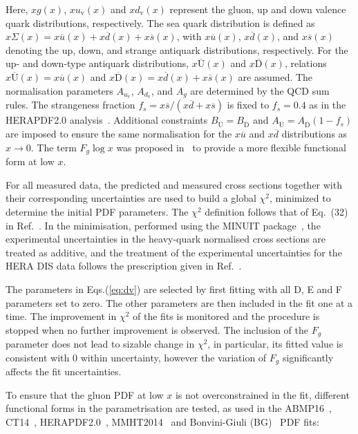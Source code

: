 \documentclass[12pt]{article}
\begin{document}
Here, $xg(x)$, $xu_{\mathrm{v}}(x)$ and $xd_{\mathrm{v}}(x)$ represent the gluon, up and down valence quark distributions, respectively. The sea quark distribution is defined as $x\Sigma(x)=x\overline{u}(x)+x\overline{d}(x)+x\overline{s}(x)$, with $x\overline{u}(x)$, $x\overline{d}(x)$, and $x\overline{s}(x)$ denoting the up, down, and strange antiquark distributions, respectively.
For the up- and down-type antiquark distributions, $x\overline{\mathrm{U}}(x)$ and $x\overline{\mathrm{D}}(x)$, relations $x\overline{\mathrm{U}}(x) = x\overline{u}(x)$ and $x\overline{\mathrm{D}}(x) = x\overline{d}(x) + x\overline{s}(x)$  are assumed.
The normalisation parameters $A_{u_{\mathrm{v}}}$, $A_{d_\mathrm{v}}$, and $A_{g}$ are determined by the QCD sum rules.
The strangeness fraction $f_{s} = x\overline{s}/( x\overline{d} + x\overline{s})$ is fixed to
$f_{s}=0.4$ as in the HERAPDF2.0 analysis~\cite{Abramowicz:2015mha}.
Additional constraints $B_{\overline{\mathrm{U}}} = B_{\overline{\mathrm{D}}}$ and $A_{\overline{\mathrm{U}}} = A_{\overline{\mathrm{D}}}(1 - f_{s})$ are imposed to ensure the same normalisation for the $x\overline{u}$ and $x\overline{d}$ distributions as $x \to 0$.
The term $F_g\log x$ was proposed in~\cite{Bonvini:2019wxf} to provide a more flexible functional form at low $x$.

For all measured data, the predicted and measured cross sections together with their corresponding uncertainties are used to build a global $\chi^2$, minimized to determine the initial PDF
parameters. The $\chi^2$ definition follows that of Eq.~(32) in Ref.~\cite{Abramowicz:2015mha}. In the minimisation, performed 
using the MINUIT package~\cite{James:1975dr}, the experimental uncertainties in the heavy-quark normalised cross 
sections are treated as additive, and the treatment of the experimental uncertainties for the HERA DIS data follows 
the prescription given in Ref.~\cite{Abramowicz:2015mha}.

The parameters in Eqs.(\ref{eq:dv}) are selected by first fitting with all D, E and F parameters set to zero. The other 
parameters are then included in the fit one at a time. The improvement in $\chi^2$ of the fits is monitored and the 
procedure is stopped when no further improvement is observed. The inclusion of the $F_{g}$ parameter does not lead to sizable change in $\chi^2$, in particular, its fitted value is consistent with $0$ within uncertainty, however the variation of $F_{g}$ significantly affects the fit uncertainties.
 
To ensure that the gluon PDF at low $x$ is not overconstrained in the fit, different functional forms in the parametrisation 
are tested, as used in the ABMP16~\cite{Alekhin:2017kpj}, CT14~\cite{Dulat:2015mca}, HERAPDF2.0~\cite{Abramowicz:2015mha}, MMHT2014~\cite{Harland-Lang:2014zoa} and Bonvini-Giuli (BG)~\cite{Bonvini:2019wxf} PDF fits:
\end{document}
